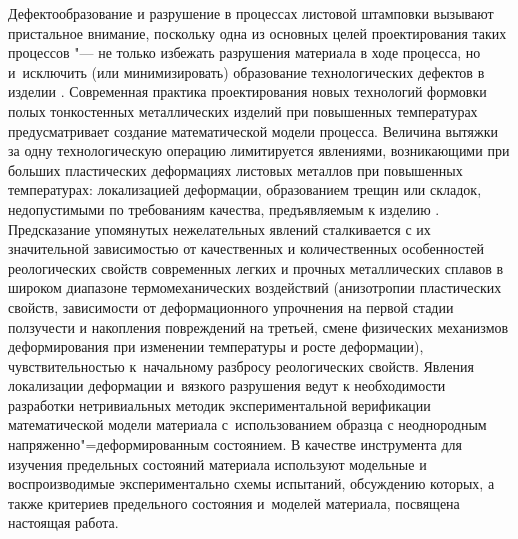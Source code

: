 Дефектообразование и разрушение в процессах листовой штамповки вызывают пристальное внимание, поскольку одна из основных целей проектирования таких процессов "--- не только избежать разрушения материала в ходе процесса, но и~исключить (или минимизировать) образование технологических дефектов в изделии \cite{keller:bib:ver}. Современная практика проектирования новых технологий формовки полых тонкостенных металлических изделий при повышенных температурах предусматривает создание математической модели процесса. Величина вытяжки за одну технологическую операцию лимитируется явлениями, возникающими при больших пластических деформациях листовых металлов при повышенных температурах: локализацией деформации, образованием трещин или складок, недопустимыми по требованиям качества, предъявляемым к изделию \cite{keller:bib:marcbook, keller:bib:martins2015}. Предсказание упомянутых нежелательных явлений сталкивается с их значительной зависимостью от качественных и количественных особенностей реологических свойств современных легких и прочных металлических сплавов в широком диапазоне термомеханических воздействий (анизотропии пластических свойств, зависимости от деформационного упрочнения на первой стадии ползучести и накопления повреждений на третьей, смене физических механизмов деформирования при изменении температуры и росте деформации), чувствительностью к~начальному разбросу реологических свойств. Явления локализации деформации и~вязкого разрушения ведут к необходимости разработки нетривиальных методик экспериментальной верификации математической модели материала с~использованием образца с неоднородным напряженно"=деформированным состоянием. В качестве инструмента для изучения предельных состояний материала используют модельные и воспроизводимые экспериментально схемы испытаний, обсуждению которых, а также критериев предельного состояния и~моделей материала, посвящена настоящая работа. 



